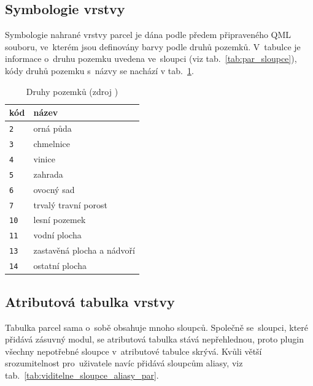\subsection{Symbologie vrstvy \texttt{}}
\label{symbologie_par}

Symbologie nahrané vrstvy parcel je dána podle předem připraveného QML souboru, ve~kterém jsou definovány barvy podle druhů pozemků. V~tabulce \texttt{} je informace o~druhu pozemku uvedena ve~sloupci \texttt{} (viz tab.~\ref{tab:par_sloupce}), kódy druhů pozemku s~názvy se nachází v tab.~\ref{tab:druhy_pozemku}.

\begin{table}[H]
    \begin{tabular}{|l|l|}
        \hline
         kód & název \\
        \hline
        \hline
          \texttt{2} & orná půda \\ \hline
          \texttt{3} & chmelnice \\ \hline          
          \texttt{4} & vinice \\ \hline
          \texttt{5} & zahrada \\ \hline
          \texttt{6} & ovocný sad \\ \hline
          \texttt{7} & trvalý travní porost \\ \hline
          \texttt{10} & lesní pozemek \\ \hline
          \texttt{11} & vodní plocha \\ \hline
          \texttt{13} & zastavěná plocha a nádvoří \\ \hline
          \texttt{14} & ostatní plocha \\
         \hline
    \end{tabular}
    \centering
    \caption[Druhy pozemků]{Druhy pozemků (zdroj \citep{vyhlaska_357})}
    \label{tab:druhy_pozemku}
\end{table}

\newpage

\subsection{Atributová tabulka vrstvy \texttt{}}
\label{tabulka_par}

Tabulka parcel sama o~sobě obsahuje mnoho sloupců. Společně se~sloupci, které přidává zásuvný modul, se atributová tabulka stává nepřehlednou, proto plugin všechny nepotřebné sloupce v~atributové tabulce skrývá. Kvůli větší srozumitelnost pro~uživatele navíc přidává sloupcům aliasy, viz tab.~\ref{tab:viditelne_sloupce_aliasy_par}.

